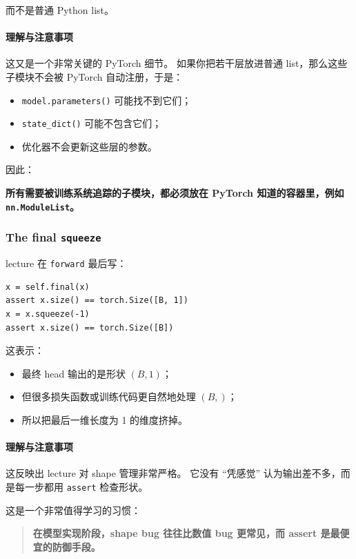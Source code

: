 \documentclass[a4paper,UTF8]{article}
\numberwithin{equation}{section}
\begin{document}
而不是普通 Python list。

\paragraph{理解与注意事项}
这又是一个非常关键的 PyTorch 细节。  
如果你把若干层放进普通 list，那么这些子模块不会被 PyTorch 自动注册，于是：
\begin{itemize}
    \item \verb|model.parameters()| 可能找不到它们；
    \item \verb|state_dict()| 可能不包含它们；
    \item 优化器不会更新这些层的参数。
\end{itemize}

因此：
\begin{center}
\textbf{所有需要被训练系统追踪的子模块，都必须放在 PyTorch 知道的容器里，例如 \texttt{nn.ModuleList}。}
\end{center}

\subsubsection{The final \texttt{squeeze}}

lecture 在 \verb|forward| 最后写：
\begin{verbatim}
x = self.final(x)
assert x.size() == torch.Size([B, 1])
x = x.squeeze(-1)
assert x.size() == torch.Size([B])
\end{verbatim}

这表示：
\begin{itemize}
    \item 最终 head 输出的是形状 \((B,1)\)；
    \item 但很多损失函数或训练代码更自然地处理 \((B,)\)；
    \item 所以把最后一维长度为 1 的维度挤掉。
\end{itemize}

\paragraph{理解与注意事项}
这反映出 lecture 对 shape 管理非常严格。  
它没有 ``凭感觉'' 认为输出差不多，而是每一步都用 \verb|assert| 检查形状。

这是一个非常值得学习的习惯：

\begin{quote}
\textbf{在模型实现阶段，shape bug 往往比数值 bug 更常见，而 assert 是最便宜的防御手段。}
\end{quote}
\end{document}
